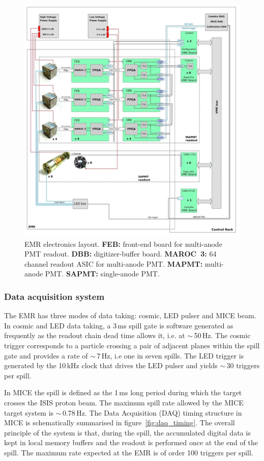 \documentclass[a4paper,11pt]{article}
\begin{document}
\begin{figure}[htp!]
 \centering
 \includegraphics[width=\textwidth]{./EMR_electronics_layout}
 \caption[EMR electronics layout.]{EMR electronics layout. {\bf FEB:} front-end board for multi-anode PMT readout. {\bf DBB:} digitizer-buffer
 board. {\bf MAROC~3:} 64 channel readout ASIC for multi-anode PMT. {\bf MAPMT:} multi-anode PMT. {\bf SAPMT:} single-anode PMT.}
 \label{fig:EMR_electronics_layout}
\end{figure}

\subsubsection{Data acquisition system}
The EMR has three modes of data taking: cosmic, LED pulser and MICE beam. In cosmic and LED data taking, a 3\,ms spill gate is software generated as frequently as the readout chain dead time allows it, i.e. at $\sim$\,50\,Hz. The cosmic trigger corresponds to a particle crossing a pair of adjacent planes within the spill gate and provides a rate of $\sim$\,7\,Hz, i.e one in seven spills. The LED trigger is generated by the 10\,kHz clock that drives the LED pulser and yields $\sim$\,30 triggers per spill.

In MICE the spill is defined as the 1\,ms long period during which the target crosses the ISIS proton beam. The maximum spill rate allowed by the
MICE target system is $\sim\,$0.78\,Hz. The Data Acquisition (DAQ) timing structure in MICE is schematically summarised in figure~\ref{fig:daq_timing}. 
The overall principle of the system is that, during the spill, the
accumulated digital data is kept in local memory buffers and the readout is performed once at the end of the spill. The maximum rate expected at the EMR is of order 100 triggers per spill.
\end{document}
